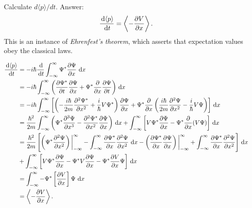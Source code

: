 \documentclass[en, oneside]{vivi}
\begin{document}
\begin{prob}
    Calculate $d \langle p \rangle / dt$. Answer:
    \begin{equation*}
        \frac{\dif \langle p \rangle}{\dif t} = \left\langle - \frac{\partial V}{\partial x} \right\rangle.
    \end{equation*}
    This is an instance of \textit{Ehrenfest's theorem}, which asserts that expectation values obey the classical laws.
\end{prob}

\begin{sol}
    \begin{align}
        \frac{\dif \langle p \rangle}{\dif t} &= -i \hbar \frac{\dif}{\dif t} \int_{-\infty}^{\infty} \Psi^* \frac{\partial \Psi}{\partial x} \dif x\\
        &= -i \hbar \int_{-\infty}^{\infty} \left( \frac{\partial \Psi^*}{\partial t} \frac{\partial \Psi}{\partial x} + \Psi^* \frac{\partial}{\partial x} \frac{\partial \Psi}{\partial t}\right) \dif x\\
        &= -i \hbar \int_{-\infty}^{\infty} \left[ \left( -\frac{i \hbar}{2m} \frac{\partial^2 \Psi^*}{\partial x^2} + \frac{i}{\hbar}V \Psi^*\right) \frac{\partial \Psi}{\partial x} +
        \Psi^* \frac{\partial}{\partial x} \left( \frac{i \hbar}{2m} \frac{\partial^2 \Psi}{\partial x^2} - \frac{i}{\hbar}V \Psi \right) \right] \dif x\\
        &= \frac{\hbar^2}{2m} \int_{-\infty}^{\infty}\left( \Psi^* \frac{\partial^3 \Psi}{\partial x^3} - \frac{\partial^2 \Psi^*}{\partial x^2} \frac{\partial \Psi}{\partial x}\right) \dif x +
        \int_{-\infty}^{\infty} \left[V \Psi^* \frac{\partial \Psi}{\partial x} - \Psi^* \frac{\partial}{\partial x} (V \Psi)\right] \dif x\\
        &= \frac{\hbar^2}{2m} \left[ \left(\Psi^* \frac{\partial^2 \Psi}{\partial x^2} \right) \bigg|_{-\infty}^{\infty} - \int_{-\infty}^{\infty} \frac{\partial \Psi^*}{\partial x} \frac{\partial^2 \Psi}{\partial x^2} \dif x -
        \left( \frac{\partial \Psi^*}{\partial x} \frac{\partial \Psi}{\partial x} \right) \bigg|_{-\infty}^{\infty} + \int_{-\infty}^{\infty} \frac{\partial \Psi^*}{\partial x} \frac{\partial^2 \Psi}{\partial x^2} \right]\dif x\\
        &+ \int_{-\infty}^{\infty} \left[V \Psi^* \frac{\partial \Psi}{\partial x} - \Psi^* V \frac{\partial \Psi}{\partial x} - \Psi^* \frac{\partial V}{\partial x} \Psi\right] \dif x\\
        &= \int_{-\infty}^{\infty} - \Psi^* \left[ \frac{\partial V}{\partial x} \right] \Psi \dif x\\
        &= \left\langle - \frac{\partial V}{\partial x} \right\rangle.
    \end{align}
\end{sol}
\end{document}
